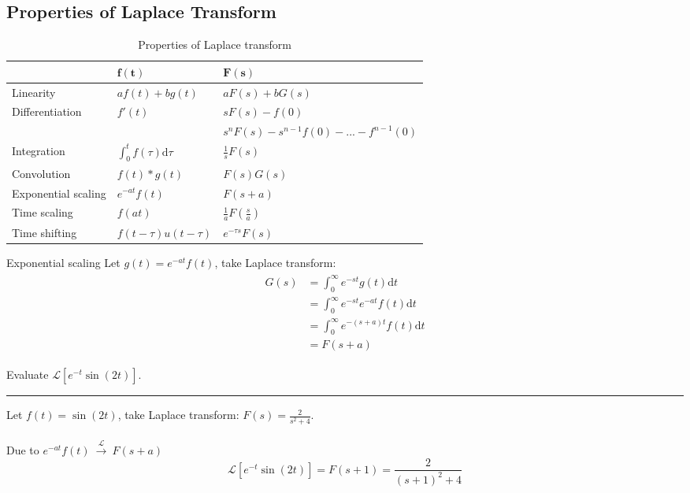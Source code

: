 \subsection{Properties of Laplace Transform}
\begin{table}[H]\centering
    \caption{Properties of Laplace transform}
    \begin{tabular}{p{4cm} p{3cm} p{6cm}}
    \toprule
    & $\boldsymbol{f(t)}$ & $\boldsymbol{F(s)}$\\ \midrule
    Linearity & $af(t)+bg(t)$ & $aF(s)+bG(s)$ \\ [1.5ex] 
    
    Differentiation & $f'(t)$  & $ sF(s)-f(0)$ \\
    &&$s^{n}F(s)-s^{n-1}f(0)-...-  f^{n-1}(0)$\\[1.5ex] 
    
    Integration& $\int_{0}^{t}f(\tau)\mathrm{d}\tau$ &  $\displaystyle \frac{1}{s} F(s)$  \\  [1.5ex] 
    Convolution&  $f(t)*g(t)$ & $F(s)G(s)$  \\ [1.5ex]
    
    Exponential scaling & $e^{-at}f(t)$ & $F(s+a)$  \\ [1.5ex] 
    
    Time scaling & $f(at)$ & $\displaystyle \frac{1}{a}F(\frac{s}{a})$\\ [1.5ex] 
    
    Time shifting & $f(t-\tau)u(t-\tau)$ & $e^{-\tau s}F(s)$ \\ [1.5ex] 
    \bottomrule
\end{tabular}
\end{table}

\begin{dv}{Exponential scaling}
Let $g(t)=e^{-at}f(t)$, take Laplace transform:
\begin{align*} 
    \begin{split}
        G(s) &= \int_{0}^{\infty}e^{-st}g(t) \mathrm{d}t\\
        &=\int_{0}^{\infty}e^{-st}e^{-at}f(t) \mathrm{d}t\\
        &= \int_{0}^{\infty}e^{-(s+a)t}f(t) \mathrm{d}t\\
        &= F(s+a)
    \end{split} 
\end{align*}
\end{dv}
\begin{ex}{}
Evaluate $ \mathcal{L}[e^{-t}\sin(2t)]$.
\vspace{.3cm} \hrule \vspace{.3cm} 
Let $f(t) = \sin(2t)$, take Laplace transform: $\displaystyle F(s) = \frac{2}{s^{2}+4}$.\\\\
Due to $e^{-at}f(t) \ \xrightarrow{\mathcal{L}}  \ F(s+a)$
\[\mathcal{L}[e^{-t}\sin(2t)] = F(s+1) = \frac{2}{(s+1)^{2}+4}\]
\end{ex}
